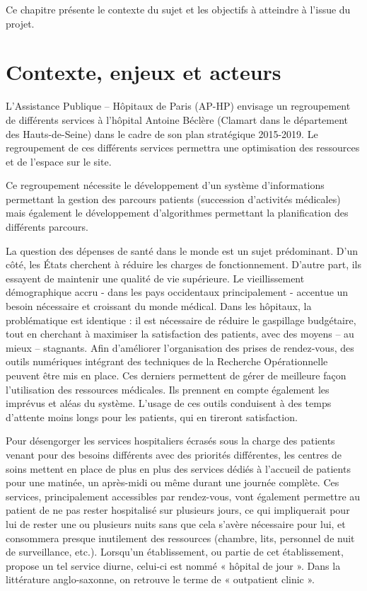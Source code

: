 \documentclass{polytech/polytech}
\begin{document}
Ce chapitre présente le contexte du sujet et les objectifs à atteindre à l'issue du projet.

\section{Contexte, enjeux et acteurs}



L'Assistance Publique – Hôpitaux de Paris (AP-HP) envisage un regroupement de différents services à l'hôpital Antoine Béclère (Clamart dans le département des Hauts-de-Seine) dans le cadre de son plan stratégique 2015-2019. Le regroupement de ces différents services permettra une optimisation des ressources et de l'espace sur le site.

Ce regroupement nécessite le développement d'un système d'informations permettant la gestion des parcours patients (succession d'activités médicales) mais également le développement d'algorithmes permettant la planification des différents parcours.


La question des dépenses de santé dans le monde est un sujet prédominant. D'un côté, les États cherchent à réduire les charges de fonctionnement. D'autre part, ils essayent de maintenir une qualité de vie supérieure. Le vieillissement démographique accru - dans les pays occidentaux principalement - accentue un besoin nécessaire et croissant du monde médical. Dans les hôpitaux, la problématique est identique : il est nécessaire de réduire le gaspillage budgétaire, tout en cherchant à maximiser la satisfaction des patients, avec des moyens – au mieux – stagnants. Afin d'améliorer l'organisation des prises de rendez-vous, des outils numériques intégrant des techniques de la Recherche Opérationnelle peuvent être mis en place. Ces derniers permettent de gérer de meilleure façon l'utilisation des ressources médicales. Ils prennent en compte également les imprévus et aléas du système. L'usage de ces outils conduisent à des temps d'attente moins longs pour les patients, qui en tireront satisfaction.

Pour désengorger les services hospitaliers écrasés sous la charge des patients venant pour des besoins différents avec des priorités différentes, les centres de soins mettent en place de plus en plus des services dédiés à l'accueil de patients pour une matinée, un après-midi ou même durant une journée complète. Ces services, principalement accessibles par rendez-vous, vont également permettre au patient de ne pas rester hospitalisé sur plusieurs jours, ce qui impliquerait pour lui de rester une ou plusieurs nuits sans que cela s'avère nécessaire pour lui, et consommera presque inutilement des ressources (chambre, lits, personnel de nuit de surveillance, etc.). Lorsqu'un établissement, ou partie de cet établissement, propose un tel service diurne, celui-ci est nommé « hôpital de jour ». Dans la littérature anglo-saxonne, on retrouve le terme de « outpatient clinic ».
\end{document}
